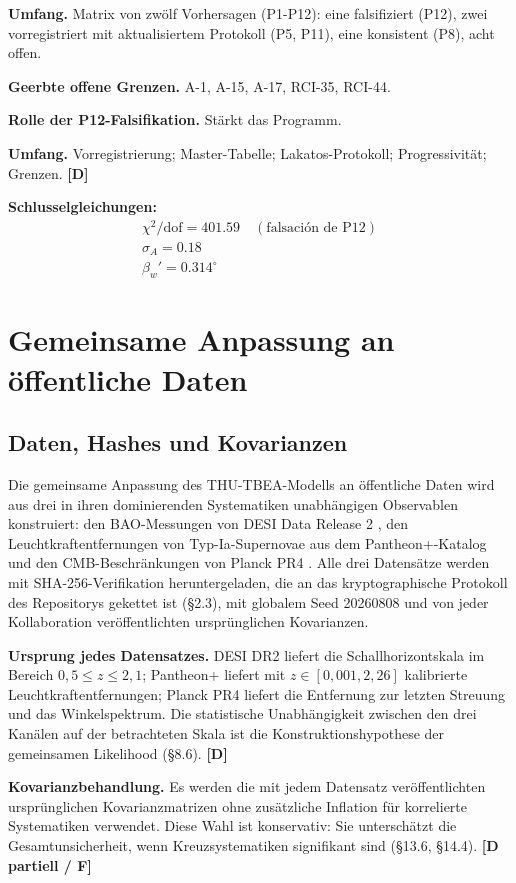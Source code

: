 ﻿\documentclass[11pt,letterpaper]{article}
\begin{document}
\textbf{Umfang.} Matrix von zwölf Vorhersagen (P1-P12): eine falsifiziert (P12), zwei vorregistriert mit aktualisiertem Protokoll (P5, P11), eine konsistent (P8), acht offen.

\textbf{Geerbte offene Grenzen.} A-1, A-15, A-17, RCI-35, RCI-44.

\textbf{Rolle der P12-Falsifikation.} Stärkt das Programm.

\textbf{Umfang.} Vorregistrierung; Master-Tabelle; Lakatos-Protokoll; Progressivität; Grenzen. \textbf{[D]}

\textbf{Schlusselgleichungen:}
\begin{align*}
    \chi^2/\mathrm{dof} = 401.59 \quad (\text{falsaci\'on de P12}) \\
    \sigma_A = 0.18 \\
    \beta_w' = 0.314^\circ
\end{align*}
\section{Gemeinsame Anpassung an öffentliche Daten}
\subsection{Daten, Hashes und Kovarianzen}
Die gemeinsame Anpassung des THU-TBEA-Modells an öffentliche Daten wird aus drei in ihren dominierenden Systematiken unabhängigen Observablen konstruiert: den BAO-Messungen von DESI Data Release 2 \cite{Lodha2025}, den Leuchtkraftentfernungen von Typ-Ia-Supernovae aus dem Pantheon+-Katalog \cite{Brout2022} und den CMB-Beschränkungen von Planck PR4 \cite{Sullivan2025}. Alle drei Datensätze werden mit SHA-256-Verifikation heruntergeladen, die an das kryptographische Protokoll des Repositorys gekettet ist (§2.3), mit globalem Seed 20260808 und von jeder Kollaboration veröffentlichten ursprünglichen Kovarianzen.

\textbf{Ursprung jedes Datensatzes.} DESI DR2 liefert die Schallhorizontskala im Bereich $0{,}5 \le z \le 2{,}1$; Pantheon+ liefert mit $z \in [0{,}001, 2{,}26]$ kalibrierte Leuchtkraftentfernungen; Planck PR4 liefert die Entfernung zur letzten Streuung und das Winkelspektrum. Die statistische Unabhängigkeit zwischen den drei Kanälen auf der betrachteten Skala ist die Konstruktionshypothese der gemeinsamen Likelihood (§8.6). \textbf{[D]}

\textbf{Kovarianzbehandlung.} Es werden die mit jedem Datensatz veröffentlichten ursprünglichen Kovarianzmatrizen ohne zusätzliche Inflation für korrelierte Systematiken verwendet. Diese Wahl ist konservativ: Sie unterschätzt die Gesamtunsicherheit, wenn Kreuzsystematiken signifikant sind (§13.6, §14.4). \textbf{[D partiell / F]}
\end{document}
